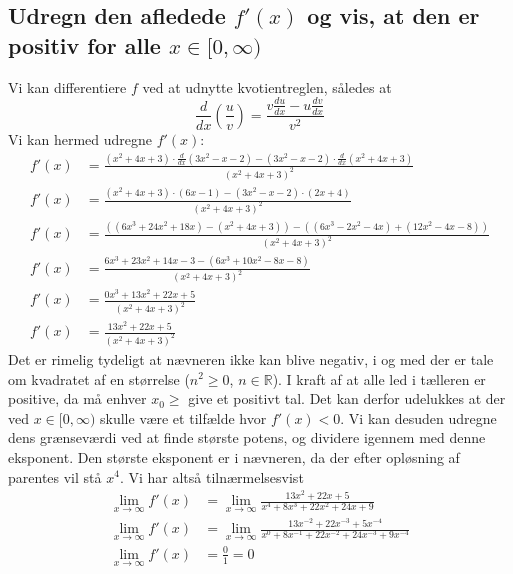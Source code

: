 \documentclass{report}
\begin{document}
\subsection{Udregn den afledede $f'(x)$ og vis, at den er positiv for alle $x\in[0,\infty)$}
Vi kan differentiere $f$ ved at udnytte kvotientreglen, således at$$\frac{d}{dx}\left(\frac{u}{v}\right)=\frac{v\frac{du}{dx}-u\frac{dv}{dx}}{v^2}$$Vi kan hermed udregne $f'(x)$:
\begin{align*}
    f'(x)&=\frac{(x^2+4x+3)\cdot\frac{d}{dx}(3x^2-x-2)-(3x^2-x-2)\cdot\frac{d}{dx}(x^2+4x+3)}{(x^2+4x+3)^2}\\
    f'(x)&=\frac{(x^2+4x+3)\cdot(6x-1)-(3x^2-x-2)\cdot(2x+4)}{(x^2+4x+3)^2}\\
    f'(x)&=\frac{((6x^3+24x^2+18x)-(x^2+4x+3))-((6x^3-2x^2-4x)+(12x^2-4x-8))}{(x^2+4x+3)^2}\\
    f'(x)&=\frac{6x^3+23x^2+14x-3-(6x^3+10x^2-8x-8)}{(x^2+4x+3)^2}\\
    f'(x)&=\frac{0x^3+13x^2+22x+5}{(x^2+4x+3)^2}\\
    f'(x)&=\frac{13x^2+22x+5}{(x^2+4x+3)^2}
\end{align*}
Det er rimelig tydeligt at nævneren ikke kan blive negativ, i og med der er tale om kvadratet af en størrelse ($n^2\geq0$, $n\in\mathbb{R}$). I kraft af at alle led i tælleren er positive, da må enhver $x_0\geq$ give et positivt tal. Det kan derfor udelukkes at der ved $x\in[0,\infty)$ skulle være et tilfælde hvor $f'(x)<0$. Vi kan desuden udregne dens grænseværdi ved at finde største potens, og dividere igennem med denne eksponent. Den største eksponent er i nævneren, da der efter opløsning af parentes vil stå $x^4$. Vi har altså tilnærmelsesvist
\begin{align*}
    \lim_{x\to\infty}f'(x)&=\lim_{x\to\infty}\frac{13x^2+22x+5}{x^4 + 8 x^3 + 22 x^2 + 24 x + 9}\\\lim_{x\to\infty}f'(x)&=\lim_{x\to\infty}\frac{13x^{-2}+22x^{-3}+5x^{-4}}{x^0 + 8x^{-1} + 22 x^{-2} + 24 x^{-3} + 9x^{-4}}\\\lim_{x\to\infty}f'(x)&=\frac{0}{1}=0
\end{align*}
\end{document}
